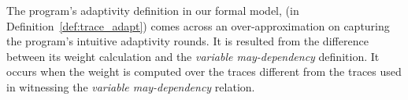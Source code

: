 \begin{example}
    \label{ex:multipleRoundSingle}
    The program's adaptivity definition in our formal model,
    (in Definition~\ref{def:trace_adapt})
     comes across an over-approximation on capturing the program's intuitive adaptivity rounds.
    It is resulted from the difference between its weight calculation and the \emph{variable may-dependency} definition.
    It occurs when the weight is computed over the traces different from the traces used in 
    witnessing the \emph{variable may-dependency} relation.
    

\end{example}
